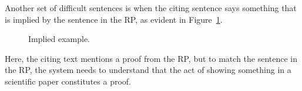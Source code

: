\documentclass[11pt]{article}
\begin{document}
Another set of difficult sentences is when the citing sentence says something 
that is implied by the sentence in the RP, as evident in Figure~\ref{f:3}.

\begin{figure}
\noindent{}
\caption{Implied example.}
\label{f:3}
\end{figure}

Here, the citing text mentions a proof from the RP, but to match the 
sentence in the RP, the system needs to understand that the act of 
showing something in a scientific paper constitutes a proof.
\end{document}
